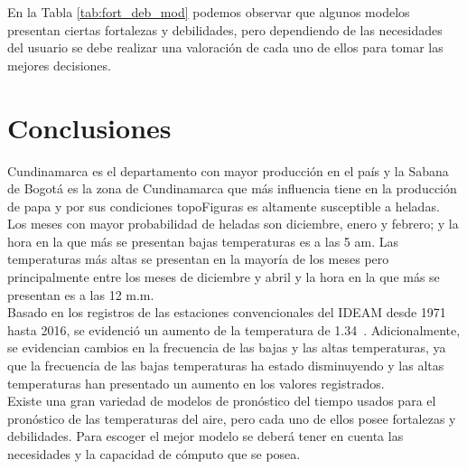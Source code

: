 En la Tabla \ref{tab:fort_deb_mod} podemos observar que algunos modelos presentan ciertas fortalezas y debilidades, pero dependiendo de las necesidades del usuario se debe realizar una valoración de cada uno de ellos para tomar las mejores decisiones.


\section{Conclusiones}

Cundinamarca es el departamento con mayor producción en el país y la Sabana de Bogotá es la zona de Cundinamarca que más influencia tiene en la producción de papa y por sus condiciones topoFiguras es altamente susceptible a heladas.\\

Los meses con mayor probabilidad de heladas son diciembre, enero y febrero; y la hora en la que más se presentan bajas temperaturas es a las 5 am. Las temperaturas más altas se presentan en la mayoría de los meses pero principalmente entre los meses de diciembre y abril y la hora en la que más se presentan es a las 12 m.m.\\

Basado en los registros de las estaciones convencionales del IDEAM desde 1971 hasta 2016, se evidenció un aumento de la temperatura de 1.34\celc \ . Adicionalmente, se evidencian cambios en la frecuencia de las bajas y las altas temperaturas, ya que la frecuencia de las bajas temperaturas ha estado disminuyendo y las altas temperaturas han presentado un aumento en los valores registrados.\\

Existe una gran variedad de modelos de pronóstico del tiempo usados para el pronóstico de las temperaturas del aire, pero cada uno de ellos posee fortalezas y debilidades. Para escoger el mejor modelo se deberá tener en cuenta las necesidades y la capacidad de cómputo que se posea.\\

